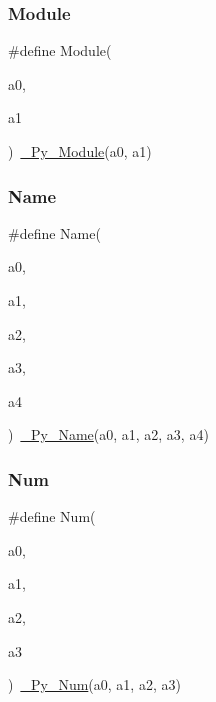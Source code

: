 \mbox{\label{_python-ast_8h_a050cb8da9f4ab67bed9b2fa2ae362a41}} 
\subsubsection{\texorpdfstring{Module}{Module}}
{\footnotesize\ttfamily \#define Module(\begin{DoxyParamCaption}\item[{}]{a0,  }\item[{}]{a1 }\end{DoxyParamCaption})~\mbox{\hyperlink{_python-ast_8h_ac22a9146d597c59e94e9511dd4db4772}{\+\_\+\+Py\+\_\+\+Module}}(a0, a1)}

\mbox{\label{_python-ast_8h_a3e9f22c154a65956ebd413d2d8dafc0f}} 
\subsubsection{\texorpdfstring{Name}{Name}}
{\footnotesize\ttfamily \#define Name(\begin{DoxyParamCaption}\item[{}]{a0,  }\item[{}]{a1,  }\item[{}]{a2,  }\item[{}]{a3,  }\item[{}]{a4 }\end{DoxyParamCaption})~\mbox{\hyperlink{_python-ast_8h_add305b1df2f60623616644e2bc5c4c96}{\+\_\+\+Py\+\_\+\+Name}}(a0, a1, a2, a3, a4)}

\mbox{\label{_python-ast_8h_a8c8f50b76976c33a0eaa959e28d7b453}} 
\subsubsection{\texorpdfstring{Num}{Num}}
{\footnotesize\ttfamily \#define Num(\begin{DoxyParamCaption}\item[{}]{a0,  }\item[{}]{a1,  }\item[{}]{a2,  }\item[{}]{a3 }\end{DoxyParamCaption})~\mbox{\hyperlink{_python-ast_8h_a79a9fac1cfaeeff22b78665840bca615}{\+\_\+\+Py\+\_\+\+Num}}(a0, a1, a2, a3)}

